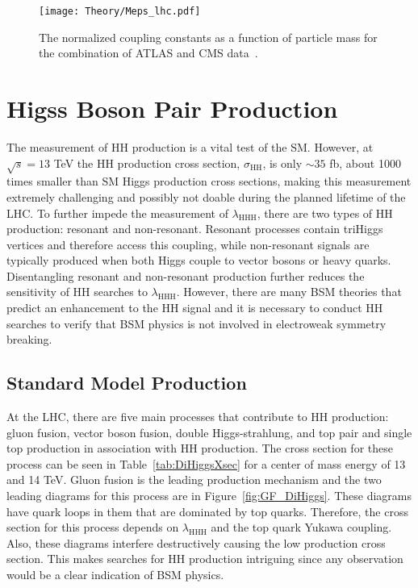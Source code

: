 \begin{figure}[h!]
 \centering
 \texttt{[image: Theory/Meps\_lhc.pdf]}
\caption{The normalized coupling constants as a function of particle mass for the combination of ATLAS and CMS data~\cite{HiggsProperties}.}
\label{fig:HiggsCouplingMeasurement}
\end{figure}


\section{Higss Boson Pair Production}

The measurement of HH production is a vital test of the SM. However, at $\sqrt{s}=13$ TeV the HH production cross section, $\sigma_{\mathrm{HH}}$, is only ${\sim}35$ fb, about 1000 times smaller than SM Higgs production cross sections, making this measurement extremely challenging and possibly not doable during the planned lifetime of the LHC. To further impede the measurement of $\lambda_{\mathrm{HHH}}$, there are two types of HH production: resonant and non-resonant. Resonant processes contain triHiggs vertices and therefore access this coupling, while non-resonant signals are typically produced when both Higgs couple to vector bosons or heavy quarks. Disentangling resonant and non-resonant production further reduces the sensitivity of HH searches to $\lambda_{\mathrm{HHH}}$. However, there are many BSM theories that predict an enhancement to the HH signal and it is necessary to conduct HH searches to verify that BSM physics is not involved in electroweak symmetry breaking. 


\subsection{Standard Model Production}
At the LHC, there are five main processes that contribute to HH production: gluon fusion, vector boson fusion, double Higgs-strahlung, and top pair and single top production in association with HH production. The cross section for these process can be seen in Table~\ref{tab:DiHiggsXsec} for a center of mass energy of 13 and 14 TeV. Gluon fusion is the leading production mechanism and the two leading diagrams for this process are in Figure~\ref{fig:GF_DiHiggs}. These diagrams have quark loops in them that are dominated by top quarks. Therefore, the cross section for this process depends on $\lambda_{\mathrm{HHH}}$ and the top quark Yukawa coupling. Also, these diagrams interfere destructively causing the low production cross section. This makes searches for HH production intriguing since any observation would be a clear indication of BSM physics.



